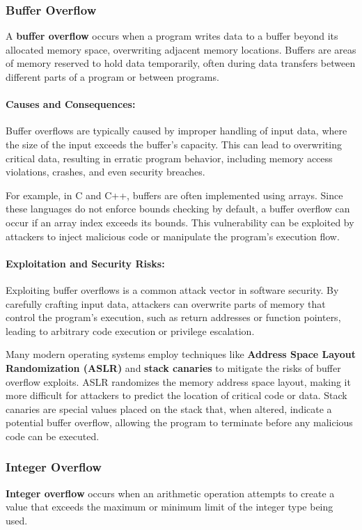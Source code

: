 \documentclass{book}
\begin{document}
\subsubsection{Buffer Overflow}
A \textbf{buffer overflow} occurs when a program writes data to a buffer beyond its allocated memory space, overwriting adjacent memory locations. Buffers are areas of memory reserved to hold data temporarily, often during data transfers between different parts of a program or between programs.

\paragraph{Causes and Consequences:}
Buffer overflows are typically caused by improper handling of input data, where the size of the input exceeds the buffer’s capacity. This can lead to overwriting critical data, resulting in erratic program behavior, including memory access violations, crashes, and even security breaches.

For example, in C and C++, buffers are often implemented using arrays. Since these languages do not enforce bounds checking by default, a buffer overflow can occur if an array index exceeds its bounds. This vulnerability can be exploited by attackers to inject malicious code or manipulate the program’s execution flow.

\paragraph{Exploitation and Security Risks:}
Exploiting buffer overflows is a common attack vector in software security. By carefully crafting input data, attackers can overwrite parts of memory that control the program's execution, such as return addresses or function pointers, leading to arbitrary code execution or privilege escalation.

Many modern operating systems employ techniques like \textbf{Address Space Layout Randomization (ASLR)} and \textbf{stack canaries} to mitigate the risks of buffer overflow exploits. ASLR randomizes the memory address space layout, making it more difficult for attackers to predict the location of critical code or data. Stack canaries are special values placed on the stack that, when altered, indicate a potential buffer overflow, allowing the program to terminate before any malicious code can be executed.

\subsubsection{Integer Overflow}
\textbf{Integer overflow} occurs when an arithmetic operation attempts to create a value that exceeds the maximum or minimum limit of the integer type being used. 
\end{document}
